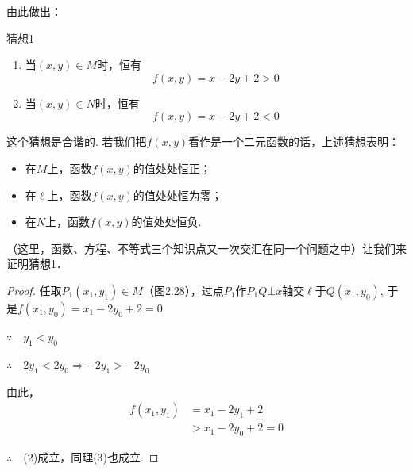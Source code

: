 由此做出：
\begin{thm}
 {猜想1}
\begin{enumerate}
    \item 当$(x,y)\in M$时，恒有
\begin{equation}
   f(x,y)=x-2y+2>0 \tag{2}
\end{equation}
\item 当$(x,y)\in N$时，恒有
\begin{equation}
    f(x,y)=x-2y+2<0\tag{3}
\end{equation}
\end{enumerate}
\end{thm}

\begin{remark}
    这个猜想是合谐的. 若我们把$f(x,y)$看作是一个二元函数的话，上述猜想表明：
\begin{itemize}
  \item 在$M$上，函数$f(x,y)$的值处处恒正；
\item 在$\ell$上，函数$f(x,y)$的值处处恒为零；
\item 在$N$上，函数$f(x,y)$的值处处恒负.
\end{itemize}

（这里，函数、方程、不等式三个知识点又一次交汇在同一个问题之中）让我们来证明猜想1．
\end{remark}

\noindent
\begin{minipage}{.52\textwidth}\CTEXindent
\begin{proof}
任取$P_1(x_1,y_1)\in M$（图2.28），过点$P_1$作$P_1Q\bot x$轴交$\ell$于$Q(x_1,y_0)$, 于是$f(x_1,y_0)=x_1-2y_0+2=0$.

$\because\quad y_1<y_0$

$\therefore\quad 2y_1<2y_0  \Rightarrow -2y_1>-2y_0$

由此，
\[\begin{split}
    f(x_1,y_1)&=x_1-2y_1+2\\
    &>x_1-2y_0+2=0
\end{split} \]

$\therefore\quad $(2)成立，同理(3)也成立.
\end{proof}
\end{minipage}\hfill
\begin{minipage}{.45\textwidth}
    \centering
{}    
\end{minipage}


